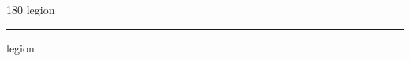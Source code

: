 
\begin{frame}
\begin{center}
\begin{turn}{180}
{\fontsize{2.5cm}{1em}\selectfont legion}
\end{turn}
\vspace{1em}\par  
\hrule
\vspace{1em}\par  
{\fontsize{2.5cm}{1em}\selectfont legion}
\end{center}
\end{frame}
